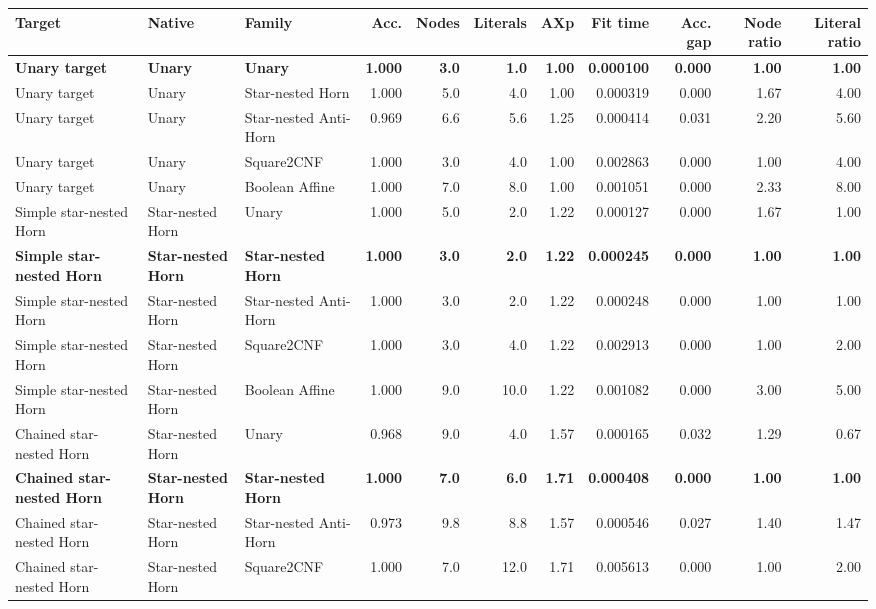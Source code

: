 \begin{tabular}{lllrrrrrrrr}
\toprule
Target & Native & Family & Acc. & Nodes & Literals & AXp & Fit time & Acc. gap & Node ratio & Literal ratio \\
\midrule
\textbf{Unary target} & \textbf{Unary} & \textbf{Unary} & \textbf{1.000} & \textbf{3.0} & \textbf{1.0} & \textbf{1.00} & \textbf{0.000100} & \textbf{0.000} & \textbf{1.00} & \textbf{1.00} \\
Unary target & Unary & Star-nested Horn & 1.000 & 5.0 & 4.0 & 1.00 & 0.000319 & 0.000 & 1.67 & 4.00 \\
Unary target & Unary & Star-nested Anti-Horn & 0.969 & 6.6 & 5.6 & 1.25 & 0.000414 & 0.031 & 2.20 & 5.60 \\
Unary target & Unary & Square2CNF & 1.000 & 3.0 & 4.0 & 1.00 & 0.002863 & 0.000 & 1.00 & 4.00 \\
Unary target & Unary & Boolean Affine & 1.000 & 7.0 & 8.0 & 1.00 & 0.001051 & 0.000 & 2.33 & 8.00 \\
Simple star-nested Horn & Star-nested Horn & Unary & 1.000 & 5.0 & 2.0 & 1.22 & 0.000127 & 0.000 & 1.67 & 1.00 \\
\textbf{Simple star-nested Horn} & \textbf{Star-nested Horn} & \textbf{Star-nested Horn} & \textbf{1.000} & \textbf{3.0} & \textbf{2.0} & \textbf{1.22} & \textbf{0.000245} & \textbf{0.000} & \textbf{1.00} & \textbf{1.00} \\
Simple star-nested Horn & Star-nested Horn & Star-nested Anti-Horn & 1.000 & 3.0 & 2.0 & 1.22 & 0.000248 & 0.000 & 1.00 & 1.00 \\
Simple star-nested Horn & Star-nested Horn & Square2CNF & 1.000 & 3.0 & 4.0 & 1.22 & 0.002913 & 0.000 & 1.00 & 2.00 \\
Simple star-nested Horn & Star-nested Horn & Boolean Affine & 1.000 & 9.0 & 10.0 & 1.22 & 0.001082 & 0.000 & 3.00 & 5.00 \\
Chained star-nested Horn & Star-nested Horn & Unary & 0.968 & 9.0 & 4.0 & 1.57 & 0.000165 & 0.032 & 1.29 & 0.67 \\
\textbf{Chained star-nested Horn} & \textbf{Star-nested Horn} & \textbf{Star-nested Horn} & \textbf{1.000} & \textbf{7.0} & \textbf{6.0} & \textbf{1.71} & \textbf{0.000408} & \textbf{0.000} & \textbf{1.00} & \textbf{1.00} \\
Chained star-nested Horn & Star-nested Horn & Star-nested Anti-Horn & 0.973 & 9.8 & 8.8 & 1.57 & 0.000546 & 0.027 & 1.40 & 1.47 \\
Chained star-nested Horn & Star-nested Horn & Square2CNF & 1.000 & 7.0 & 12.0 & 1.71 & 0.005613 & 0.000 & 1.00 & 2.00 \\

\end{tabular}
